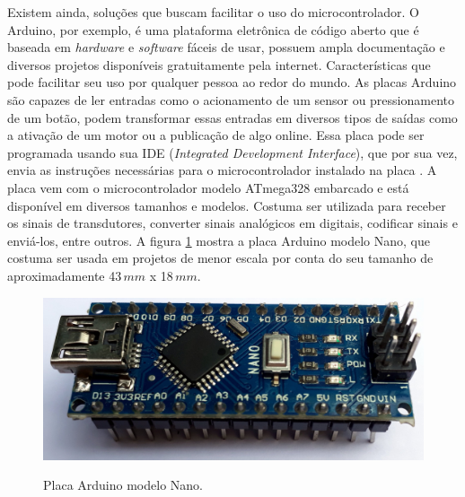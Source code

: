 \documentclass[
	12pt,				%
	openright,			%
	oneside,			%
	a4paper,			%
	english,			%
	brazil				%
	]{abntex2}
\begin{document}
		Existem ainda, soluções que buscam facilitar o uso do microcontrolador. O Arduino, por exemplo, é uma plataforma eletrônica de código aberto que é baseada em \textit{hardware} e \textit{software} fáceis de usar, possuem ampla documentação e diversos projetos disponíveis gratuitamente pela internet. Características que pode facilitar seu uso por qualquer pessoa ao redor do mundo. As placas Arduino são capazes de ler entradas como o acionamento de um sensor ou pressionamento de um botão, podem transformar essas entradas em diversos tipos de saídas como a ativação de um motor ou a publicação de algo online. Essa placa pode ser programada usando sua IDE (\textit{Integrated Development Interface}), que por sua vez, envia as instruções necessárias para o microcontrolador instalado na placa \cite{arduinosite}. A placa vem com o microcontrolador modelo ATmega328 embarcado e está disponível em diversos tamanhos e modelos. Costuma ser utilizada para receber os sinais de transdutores, converter sinais analógicos em digitais, codificar sinais e enviá-los, entre outros. A figura \ref{Fig:arduino-nano1} mostra a placa Arduino modelo Nano, que costuma ser usada em projetos de menor escala por conta do seu tamanho de aproximadamente 43$\,mm$ x 18$\,mm$.
	
		\begin{figure}[h!]
			\centering
			\caption{Placa Arduino modelo Nano.}
  		\includegraphics[width=12cm]{./figures/arduino-nano1.jpg}
  		\label{Fig:arduino-nano1}
		\end{figure}



	
\end{document}
